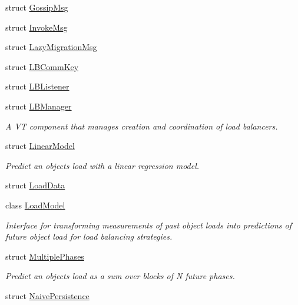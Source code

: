 \begin{DoxyCompactItemize}
\item 
struct \hyperlink{structvt_1_1vrt_1_1collection_1_1balance_1_1_gossip_msg}{Gossip\+Msg}
\item 
struct \hyperlink{structvt_1_1vrt_1_1collection_1_1balance_1_1_invoke_msg}{Invoke\+Msg}
\item 
struct \hyperlink{structvt_1_1vrt_1_1collection_1_1balance_1_1_lazy_migration_msg}{Lazy\+Migration\+Msg}
\item 
struct \hyperlink{structvt_1_1vrt_1_1collection_1_1balance_1_1_l_b_comm_key}{L\+B\+Comm\+Key}
\item 
struct \hyperlink{structvt_1_1vrt_1_1collection_1_1balance_1_1_l_b_listener}{L\+B\+Listener}
\item 
struct \hyperlink{structvt_1_1vrt_1_1collection_1_1balance_1_1_l_b_manager}{L\+B\+Manager}
\begin{DoxyCompactList}\small\item\em A VT component that manages creation and coordination of load balancers. \end{DoxyCompactList}\item 
struct \hyperlink{structvt_1_1vrt_1_1collection_1_1balance_1_1_linear_model}{Linear\+Model}
\begin{DoxyCompactList}\small\item\em Predict an object\textquotesingle{}s load with a linear regression model. \end{DoxyCompactList}\item 
struct \hyperlink{structvt_1_1vrt_1_1collection_1_1balance_1_1_load_data}{Load\+Data}
\item 
class \hyperlink{classvt_1_1vrt_1_1collection_1_1balance_1_1_load_model}{Load\+Model}
\begin{DoxyCompactList}\small\item\em Interface for transforming measurements of past object loads into predictions of future object load for load balancing strategies. \end{DoxyCompactList}\item 
struct \hyperlink{structvt_1_1vrt_1_1collection_1_1balance_1_1_multiple_phases}{Multiple\+Phases}
\begin{DoxyCompactList}\small\item\em Predict an object\textquotesingle{}s load as a sum over blocks of N future phases. \end{DoxyCompactList}\item 
struct \hyperlink{structvt_1_1vrt_1_1collection_1_1balance_1_1_naive_persistence}{Naive\+Persistence}

\end{DoxyCompactItemize}
